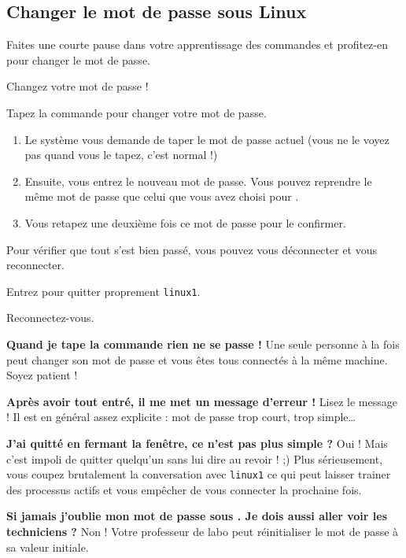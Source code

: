 \documentclass[a4paper,11pt]{style-esi/td}
\begin{document}
	\subsection{Changer le mot de passe sous Linux}

		Faites une courte pause dans votre apprentissage des commandes
		et profitez-en pour changer le mot de passe.

		\begin{Tutoriel}{Changez votre mot de passe !}
			\vspace{-1em}
			\begin{steps}
			\item Tapez la commande  pour changer votre mot de passe.
				\begin{enumerate}				
					\item 
						Le système vous demande de taper le mot de passe actuel 
						(vous ne le voyez pas quand vous le tapez, c'est normal !)
					\item 
						Ensuite, vous entrez le nouveau mot de passe.
						Vous pouvez reprendre le même mot de passe 
						que celui que vous avez choisi pour .
					\item 
						Vous retapez une deuxième fois ce mot de passe pour le confirmer.
				\end{enumerate}
			\end{steps}
			Pour vérifier que tout s'est bien passé, 
			vous pouvez vous déconnecter et vous reconnecter.
			\begin{steps}
			\item Entrez  pour quitter proprement \verb_linux1_.
			\item Reconnectez-vous. 
			\end{steps}
		\end{Tutoriel}
			
		\begin{faq}
			\textbf{Quand je tape la commande rien ne se passe !}
				Une seule personne à la fois peut changer son mot de passe 
				et vous êtes tous connectés à la même machine. 
				Soyez patient !

			\medskip	
			\textbf{Après avoir tout entré, il me met un message d'erreur !}
				Lisez le message ! Il est en général assez explicite : 
				mot de passe trop court, trop simple\dots

			\medskip
			\textbf{J'ai quitté en fermant la fenêtre, ce n'est pas plus simple ?}
				Oui ! Mais c'est impoli de quitter quelqu'un sans lui dire au revoir ! ;) 
				Plus sérieusement, vous coupez brutalement la conversation avec \texttt{linux1} 
				ce qui peut laisser trainer des processus actifs et vous empêcher de vous connecter la prochaine fois.

			\medskip
			\textbf{Si jamais j'oublie mon mot de passe sous . Je dois aussi aller voir les techniciens ?}			
				Non ! Votre professeur de labo peut réinitialiser le mot de passe  à sa valeur initiale.
		\end{faq}
\end{document}
